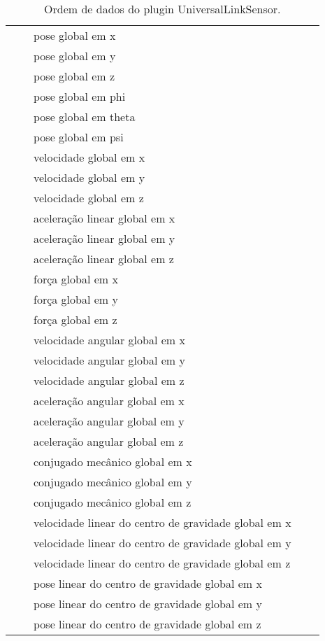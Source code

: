 \begin{table}[h]
\begin{tabular}{|rr|lrr|}
			&       & pose global em x      &       &  \\
			&       & pose global em y      &       &  \\
			&       & pose global em z      &       &  \\
			&       & pose global em phi         &       &  \\
			&       & pose global em theta &       &        \\
			&       & pose global em psi  &       &        \\
			&       & velocidade global em x &       &         \\
			&       & velocidade global em y &       &         \\
			&       & velocidade global em z &       &        \\
			&       & aceleração linear global em x &       &    \\
			&       & aceleração linear global em y &       &    \\
			&       & aceleração linear global em z &       &    \\
			&       & força global em x &             &  \\
			&       & força global em y &              &  \\
			&       & força global em z &              &  \\
			&       & velocidade angular global em x     &       &  \\
			&       & velocidade angular global em y    &       &  \\
			&       & velocidade angular global em z     &       &  \\
			&       & aceleração angular global em x    &       &  \\
			&       & aceleração angular global em y    &       &  \\
			&       & aceleração angular global em z    &       &  \\
			&       & conjugado mecânico global em x    &       &  \\
			&       & conjugado mecânico global em y    &       &  \\
			&       & conjugado mecânico global em z    &       &  \\
			&       & velocidade linear do centro de gravidade global em x &           &  \\
			&       & velocidade linear do centro de gravidade global em y &           &  \\
			&       & velocidade linear do centro de gravidade global em z &           &  \\
			&       & pose linear do centro de gravidade global em x &       &       \\
			&       & pose linear do centro de gravidade global em y &       &       \\
			&       & pose linear do centro de gravidade global em z &       &       \\
			\hline
			\end{tabular}%
			\caption{Ordem de dados do plugin UniversalLinkSensor.}
			\label{tab:UniversalLinkSensor2}%
			\end{table}%
			
